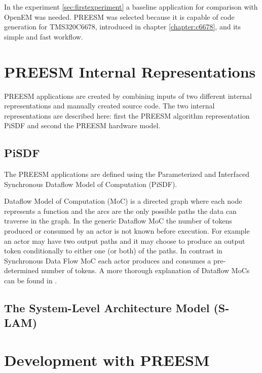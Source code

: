 In the experiment \ref{sec:firstexperiment} a baseline application for comparison
with OpenEM was needed. PREESM was selected because it is capable of code
generation for TMS320C6678, introduced in chapter \ref{chapter:c6678}, and its
simple and fast workflow.

\section{PREESM Internal Representations}
\label{sec:dataflow}
PREESM applications are created by combining inputs of two different
internal representations and manually created source code. The two internal
representations are described here: first the PREESM algorithm representation
PiSDF and second the PREESM hardware model.
\subsection{PiSDF}
The PREESM applications are defined using the Parameterized and Interfaced
Synchronous Dataflow Model of Computation (PiSDF)\cite{pelcat2014preesm}.

Dataflow Model of Computation (MoC) is a directed graph where each node
represents a function and the arcs are the only possible paths the data can
traverse in the graph. In the generic Dataflow MoC the number of tokens produced
or consumed by an actor is not known before execution. For example an actor may
have two output paths and it may choose to produce an output token conditionally
to either one (or both) of the paths. In contrast in Synchronous Data Flow MoC
each actor produces and consumes a pre-determined number of tokens.
\cite{lee1987synchronous} A more thorough explanation of Dataflow MoCs can be
found in \cite{lee2015introduction}.

\subsection{The System-Level Architecture Model (S-LAM)}

\section{Development with PREESM}
\label{sec:preesmdev}
